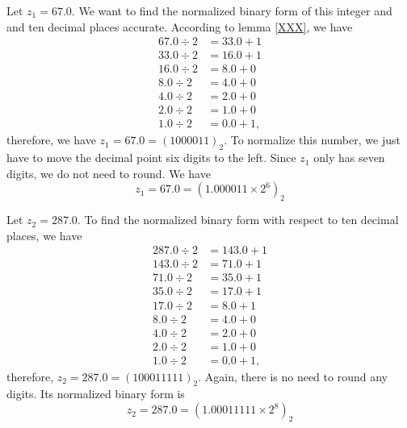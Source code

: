 \begin{exmp}
    Let \(z_1 = 67.0\). We want to find the normalized binary form of this integer and and ten decimal places accurate. According to lemma \ref{XXX}, we have
    \begin{align*}
        67.0 \div 2 &= 33.0 + 1 \\
        33.0 \div 2 &= 16.0 + 1 \\
        16.0 \div 2 &= 8.0 + 0 \\
        8.0 \div 2 &= 4.0 + 0 \\
        4.0 \div 2 &= 2.0 + 0 \\
        2.0 \div 2 &= 1.0 + 0 \\
        1.0 \div 2 &= 0.0 + 1 \text{,}
    \end{align*}
    therefore, we have \(z_1 = 67.0 = (1000011)_2\). To normalize this number, we just have to move the decimal point six digits to the left. Since \(z_1\) only has seven digits, we do not need to round. We have
    \begin{equation*}
        z_1 = 67.0 = (1.000011 \times 2^6)_2
    \end{equation*}
\end{exmp}
\begin{exmp}
    Let \(z_2 = 287.0\). To find the normalized binary form with respect to ten decimal places, we have
    \begin{align*}
        287.0 \div 2 &= 143.0 + 1 \\
        143.0 \div 2 &= 71.0 + 1 \\
        71.0 \div 2 &= 35.0 + 1 \\
        35.0 \div 2 &= 17.0 + 1 \\
        17.0 \div 2 &= 8.0 + 1 \\
        8.0 \div 2 &= 4.0 + 0 \\
        4.0 \div 2 &= 2.0 + 0 \\
        2.0 \div 2 &= 1.0 + 0 \\
        1.0 \div 2 &= 0.0 + 1 \text{,}
    \end{align*}
    therefore, \(z_2 = 287.0 = (100011111)_2\). Again, there is no need to round any digits. Its normalized binary form is
    \begin{equation*}
        z_2 = 287.0 = (1.00011111 \times 2^8)_2
    \end{equation*}
\end{exmp}
